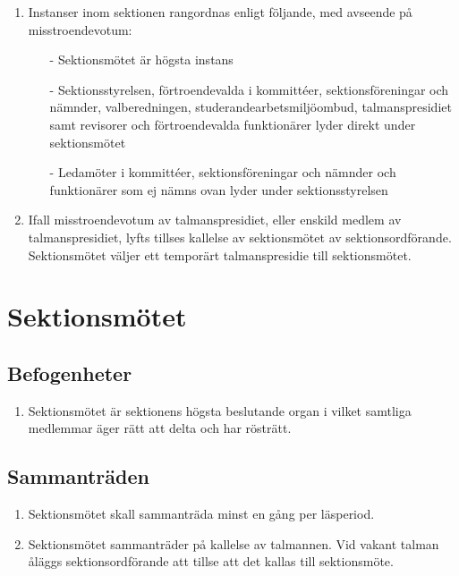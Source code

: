 \documentclass[11pt,a4paper]{article}
\begin{document}
\begin{enumerate}[\thesubsection.1]
	\item\label{rangordning} Instanser inom sektionen rangordnas enligt följande, med avseende på misstroendevotum:

		\begin{itemize}
			\item[-] Sektionsmötet är högsta instans
			\item[-] Sektionsstyrelsen, förtroendevalda i kommittéer, sektionsföreningar och nämnder, valberedningen, studerandearbetsmiljöombud, talmanspresidiet samt revisorer och förtroendevalda funktionärer lyder direkt under sektionsmötet
			\item[-] Ledamöter i kommittéer, sektionsföreningar och nämnder och funktionärer som ej nämns ovan lyder under sektionsstyrelsen
		\end{itemize}
	
	\item Ifall misstroendevotum av talmanspresidiet, eller enskild medlem av talmanspresidiet, lyfts tillses kallelse av sektionsmötet av sektionsordförande. Sektionsmötet väljer ett temporärt talmanspresidie till sektionsmötet.
	
\end{enumerate}

\newpage

\section{Sektionsmötet}

\subsection{Befogenheter}
\begin{enumerate}[\thesubsection.1]

  \item Sektionsmötet är sektionens högsta beslutande organ i vilket
  samtliga medlemmar äger rätt att delta och har rösträtt.

\end{enumerate}

\subsection{Sammanträden}
\begin{enumerate}[\thesubsection.1]

  \item Sektionsmötet skall sammanträda minst en gång per läsperiod.

  \item Sektionsmötet sammanträder på kallelse av talmannen. Vid vakant talman åläggs sektionsordförande att tillse att det kallas till sektionsmöte.

\end{enumerate}
\end{document}
